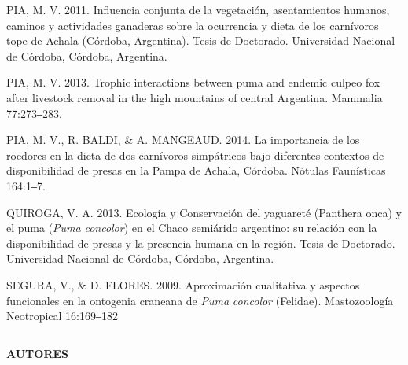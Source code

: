 \documentclass[
  x11names]{article}
\begin{document}
PIA, M. V. 2011. Influencia conjunta de la vegetación, asentamientos
humanos, caminos y actividades ganaderas sobre la ocurrencia y dieta de
los carnívoros tope de Achala (Córdoba, Argentina). Tesis de Doctorado.
Universidad Nacional de Córdoba, Córdoba, Argentina.

PIA, M. V. 2013. Trophic interactions between puma and endemic culpeo
fox after livestock removal in the high mountains of central Argentina.
Mammalia 77:273‒283.

PIA, M. V., R. BALDI, \& A. MANGEAUD. 2014. La importancia de los
roedores en la dieta de dos carnívoros simpátricos bajo diferentes
contextos de disponibilidad de presas en la Pampa de Achala, Córdoba.
Nótulas Faunísticas 164:1‒7.

QUIROGA, V. A. 2013. Ecología y Conservación del yaguareté (Panthera
onca) y el puma (\textit{Puma} \textit{concolor}) en el Chaco semiárido
argentino: su relación con la disponibilidad de presas y la presencia
humana en la región. Tesis de Doctorado. Universidad Nacional de
Córdoba, Córdoba, Argentina.

SEGURA, V., \& D. FLORES. 2009. Aproximación cualitativa y aspectos
funcionales en la ontogenia craneana de \textit{Puma} \textit{concolor}
(Felidae). Mastozoología Neotropical 16:169‒182

\setlength{\parindent}{0pt}

%
\begin{table}[H]
\centering
\begin{tabular}[t]{>{\raggedright\arraybackslash}m{16cm}>{}m{16cm}}
\toprule
\cellcolor{ceil}{\textcolor{white}{\textbf{\rule{0pt}{14pt}AUTORES}}}\\
\bottomrule
\end{tabular}
\end{table}

\textbf{AUTORES}
\end{document}
